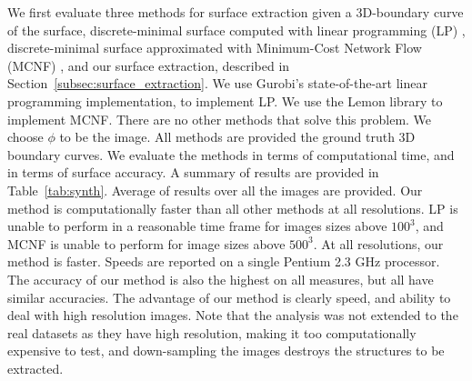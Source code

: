 \documentclass[10pt,journal,compsoc]{IEEEtran}
\begin{document}
We first evaluate three methods for surface extraction given a
3D-boundary curve of the surface, discrete-minimal surface computed
with linear programming (LP) \cite{grady2010minimal}, discrete-minimal
surface approximated with Minimum-Cost Network Flow (MCNF)
\cite{grady2010minimal, goldberg1997efficient,
  brunsch2015smoothed,ford2015flows}, and our surface extraction,
described in Section~\ref{subsec:surface_extraction}.  We use Gurobi's
state-of-the-art linear programming implementation, to implement LP.
We use the Lemon library \cite{dezsHo2011lemon} to implement MCNF.
There are no other methods that solve this problem. We choose $\phi$
to be the image. All methods are provided the ground truth 3D boundary
curves. We evaluate the methods in terms of computational time, and in
terms of surface accuracy. A summary of results are provided in
Table~\ref{tab:synth}. Average of results over all the images are
provided. Our method is computationally faster than all other methods
at all resolutions. LP is unable to perform in a reasonable time frame
for images sizes above $100^3$, and MCNF is unable to perform for
image sizes above $500^3$. At all resolutions, our method is
faster. Speeds are reported on a single Pentium 2.3 GHz processor. The
accuracy of our method is also the highest on all measures, but all
have similar accuracies. The advantage of our method is clearly speed,
and ability to deal with high resolution images.  Note that the
analysis was not extended to the real datasets as they have high
resolution, making it too computationally expensive to test, and
down-sampling the images destroys the structures to be extracted.
\end{document}
